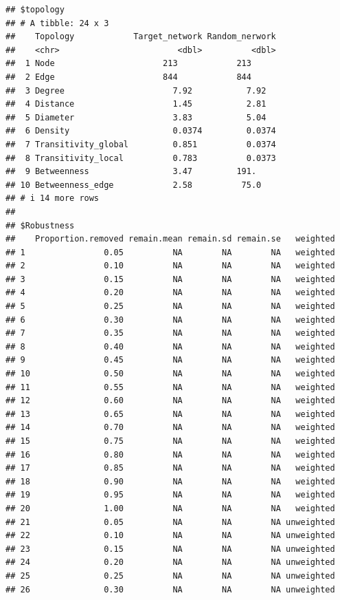 \documentclass[
]{book}
\begin{document}
\begin{verbatim}
## $topology
## # A tibble: 24 x 3
##    Topology            Target_network Random_nerwork
##    <chr>                        <dbl>          <dbl>
##  1 Node                      213            213     
##  2 Edge                      844            844     
##  3 Degree                      7.92           7.92  
##  4 Distance                    1.45           2.81  
##  5 Diameter                    3.83           5.04  
##  6 Density                     0.0374         0.0374
##  7 Transitivity_global         0.851          0.0374
##  8 Transitivity_local          0.783          0.0373
##  9 Betweenness                 3.47         191.    
## 10 Betweenness_edge            2.58          75.0   
## # i 14 more rows
## 
## $Robustness
##    Proportion.removed remain.mean remain.sd remain.se   weighted
## 1                0.05          NA        NA        NA   weighted
## 2                0.10          NA        NA        NA   weighted
## 3                0.15          NA        NA        NA   weighted
## 4                0.20          NA        NA        NA   weighted
## 5                0.25          NA        NA        NA   weighted
## 6                0.30          NA        NA        NA   weighted
## 7                0.35          NA        NA        NA   weighted
## 8                0.40          NA        NA        NA   weighted
## 9                0.45          NA        NA        NA   weighted
## 10               0.50          NA        NA        NA   weighted
## 11               0.55          NA        NA        NA   weighted
## 12               0.60          NA        NA        NA   weighted
## 13               0.65          NA        NA        NA   weighted
## 14               0.70          NA        NA        NA   weighted
## 15               0.75          NA        NA        NA   weighted
## 16               0.80          NA        NA        NA   weighted
## 17               0.85          NA        NA        NA   weighted
## 18               0.90          NA        NA        NA   weighted
## 19               0.95          NA        NA        NA   weighted
## 20               1.00          NA        NA        NA   weighted
## 21               0.05          NA        NA        NA unweighted
## 22               0.10          NA        NA        NA unweighted
## 23               0.15          NA        NA        NA unweighted
## 24               0.20          NA        NA        NA unweighted
## 25               0.25          NA        NA        NA unweighted
## 26               0.30          NA        NA        NA unweighted

\end{verbatim}
\end{document}
